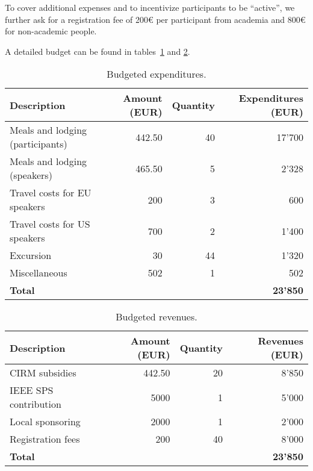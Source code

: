 \documentclass[a4paper]{scrartcl}
\begin{document}
To cover additional expenses and to incentivize participants to be ``active'',
we further ask for a registration fee of 200€ per participant from academia and
800€ for non-academic people.

A detailed budget can be found in tables~\ref{tab:expenditures} and
\ref{tab:revenues}.

\begin{table}[ht]
	\centering
	\begin{tabular}{|l|r|r|r|}
	\hline
	Description & Amount (EUR) & Quantity & Expenditures (EUR) \\
	\hline
	Meals and lodging (participants) &  442.50 & 40 & 17'700 \\
	Meals and lodging (speakers)     &  465.50 &  5 &  2'328 \\
	Travel costs for EU speakers     &  200    &  3 &    600 \\
	Travel costs for US speakers     &  700    &  2 &  1'400 \\
	Excursion                        &   30    & 44 &  1'320 \\
	Miscellaneous                    &  502    &  1 &    502 \\
	\hline
	\multicolumn{3}{|l|}{\textbf{Total}} & \textbf{23'850} \\
	\hline
	\end{tabular}
	\caption{Budgeted expenditures.}
	\label{tab:expenditures}
\end{table}

\begin{table}[ht]
	\centering
	\begin{tabular}{|l|r|r|r|}
	\hline
	Description & Amount (EUR) & Quantity & Revenues (EUR) \\
	\hline
	CIRM subsidies        & 442.50 & 20 & 8'850 \\
	IEEE SPS contribution & 5000   &  1 & 5'000 \\
	Local sponsoring      & 2000   &  1 & 2'000 \\
	Registration fees     &  200   & 40 & 8'000 \\
	\hline
	\multicolumn{3}{|l|}{\textbf{Total}} & \textbf{23'850} \\
	\hline
	\end{tabular}
	\caption{Budgeted revenues.}
	\label{tab:revenues}
\end{table}

\printbibliography
\end{document}
